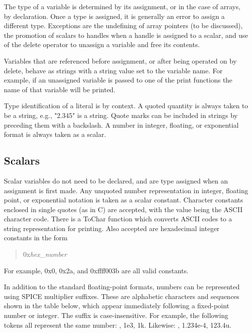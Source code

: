 The type of a variable is determined by its assignment, or in the case
of arrays, by declaration.  Once a type is assigned, it is generally
an error to assign a different type.  Exceptions are the undefining of
array pointers (to be discussed), the promotion of scalars to handles
when a handle is assigned to a scalar, and use of the {\vt delete}
operator to unassign a variable and free its contents.

Variables that are referenced before assignment, or after being
operated on by {\vt delete}, behave as strings with a string value
set to the variable name.  For example, if an unassigned variable is
passed to one of the print functions the name of that variable will be
printed.

Type identification of a literal is by context.  A quoted quantity is
always taken to be a string, e.g., {\vt "2.345"} is a string.  Quote
marks can be included in strings by preceding them with a backslash. 
A number in integer, floating, or exponential format is always taken
as a scalar.

\subsection{Scalars}

Scalar variables do not need to be declared, and are type assigned
when an assignment is first made.  Any unquoted number representation
in integer, floating point, or exponential notation is taken as a
scalar constant.  Character constants enclosed in single quotes (as in
C) are accepted, with the value being the ASCII character code.  There
is a {\vt ToChar} function which converts ASCII codes to a string
representation for printing.  Also accepted are hexadecimal integer
constants in the form
\begin{quote}
{\vt 0x}{\it hex\_number}
\end{quote}
 For example, {\vt 0x0}, {\vt 0x2a}, and {\vt 0xffff003b} are all
valid constants.

In addition to the standard floating-point formats, numbers can be
represented using SPICE multiplier suffixes.  These are alphabetic
characters and sequences shown in the table below, which appear
immediately following a fixed-point number or integer.  The suffix is
case-insensitive.  For example, the following tokens all represent the
same number:  {}, {\vt 1e3}, {\vt 1k}.  Likewise:  {}, {\vt 1.234e-4}, {\vt 123.4u}.

